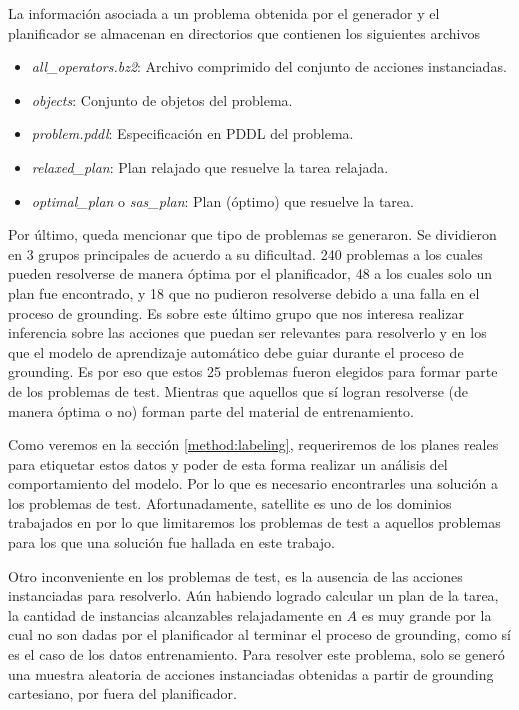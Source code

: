 La información asociada a un problema obtenida por el generador y el
planificador se almacenan en directorios que contienen los siguientes archivos

\begin{itemize}
    \item \emph{all\_operators.bz2}: Archivo comprimido del conjunto de acciones
    instanciadas.
    \item \emph{objects}: Conjunto de objetos del problema.
    \item \emph{problem.pddl}: Especificación en PDDL del problema.
    \item \emph{relaxed\_plan}: Plan relajado que resuelve la tarea relajada.
    \item \emph{optimal\_plan} o \emph{sas\_plan}: Plan (óptimo) que resuelve la
    tarea.
\end{itemize}

Por último, queda mencionar que tipo de problemas se generaron. Se dividieron en
3 grupos principales de acuerdo a su dificultad. 240 problemas a los cuales
pueden resolverse de manera óptima por el planificador, 48 a los cuales solo un
plan fue encontrado, y 18 que no pudieron resolverse debido a una falla en el
proceso de grounding. Es sobre este último grupo que nos interesa realizar
inferencia sobre las acciones que puedan ser relevantes para resolverlo y en los
que el modelo de aprendizaje automático debe guiar durante el proceso de
grounding. Es por eso que estos 25 problemas fueron elegidos para formar parte
de los problemas de test. Mientras que aquellos que sí logran resolverse (de
manera óptima o no) forman parte del material de entrenamiento.

Como veremos en la sección \ref{method:labeling}, requeriremos de los planes
reales para etiquetar estos datos y poder de esta forma realizar un análisis del
comportamiento del modelo. Por lo que es necesario encontrarles una solución a
los problemas de test. Afortunadamente, satellite es uno de los dominios
trabajados en \citep{Gnad_Torralba_Dominguez_Areces_Bustos_2019} por lo que
limitaremos los problemas de test a aquellos problemas para los que una
solución fue hallada en este trabajo.

Otro inconveniente en los problemas de test, es la ausencia de las acciones
instanciadas para resolverlo. Aún habiendo logrado calcular un plan de la tarea,
la cantidad de instancias alcanzables relajadamente en $A$ es muy grande por la
cual no son dadas por el planificador al terminar el proceso de grounding, como
sí es el caso de los datos entrenamiento. Para resolver este problema, solo se generó
una muestra aleatoria de acciones instanciadas obtenidas a partir de grounding
cartesiano, por fuera del planificador.

